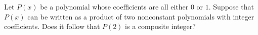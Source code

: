 Let $P(x)$ be a polynomial whose coefficients are all either $0$ or $1$.
Suppose that $P(x)$ can be written as a product of two nonconstant polynomials with integer coefficients. Does it follow that $P(2)$ is a composite integer?
